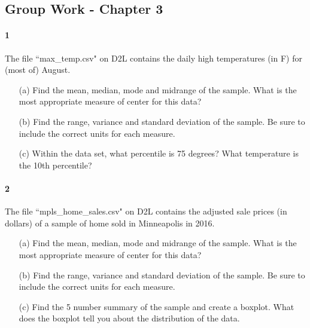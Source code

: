 \documentclass{article}
\begin{document}
\begin{flushleft}
\section*{Group Work - Chapter 3}
\paragraph{1} The file ``max\_temp.csv" on D2L contains the daily high temperatures (in F) for (most of) August. 
\begin{itemize}
\item [(a)] Find the mean, median, mode and midrange of the sample. What is the most appropriate measure of center for this data?
\vspace{2.25in}
\item[(b)] Find the range, variance and standard deviation of the sample. Be sure to include the correct units for each measure.
\vspace{2.25in}
\item[(c)] Within the data set, what percentile is 75 degrees? What temperature is the 10th percentile?
\end{itemize}



\newpage
\paragraph{2} The file ``mpls\_home\_sales.csv" on D2L contains the adjusted sale prices (in dollars) of a sample of home sold in Minneapolis in 2016. 
\begin{itemize}
\item [(a)] Find the mean, median, mode and midrange of the sample. What is the most appropriate measure of center for this data?
\vspace{2.25in}
\item[(b)] Find the range, variance and standard deviation of the sample. Be sure to include the correct units for each measure.
\vspace{2.25in}
\item[(c)] Find the 5 number summary of the sample and create a boxplot. What does the boxplot tell you about the distribution of the data.
\end{itemize}

\newpage

\end{flushleft}
\end{document}
